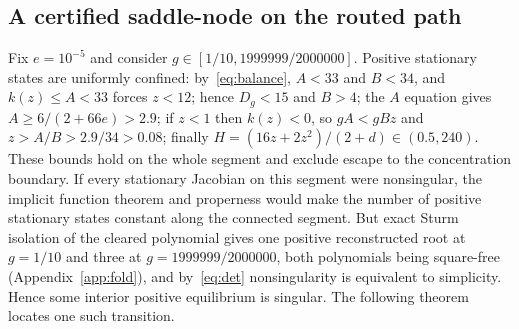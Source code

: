\documentclass[11pt,a4paper]{article}
\theoremstyle{plain}
\theoremstyle{definition}
\theoremstyle{remark}
\begin{document}
\subsection{A certified saddle-node on the routed path}\label{sec:fold}

Fix $e=10^{-5}$ and consider $g\in[1/10,1999999/2000000]$. Positive stationary states are uniformly confined: by~\eqref{eq:balance}, $A<33$ and $B<34$, and $k(z)\le A<33$ forces $z<12$; hence $D_g<15$ and $B>4$; the $A$ equation gives $A\ge6/(2+66e)>2.9$; if $z<1$ then $k(z)<0$, so $gA<gBz$ and $z>A/B>2.9/34>0.08$; finally $H=(16z+2z^2)/(2+d)\in(0.5,240)$. These bounds hold on the whole segment and exclude escape to the concentration boundary. If every stationary Jacobian on this segment were nonsingular, the implicit function theorem and properness would make the number of positive stationary states constant along the connected segment. But exact Sturm isolation of the cleared polynomial gives one positive reconstructed root at $g=1/10$ and three at $g=1999999/2000000$, both polynomials being square-free (Appendix~\ref{app:fold}), and by~\eqref{eq:det} nonsingularity is equivalent to simplicity. Hence some interior positive equilibrium is singular. The following theorem locates one such transition.
\end{document}
